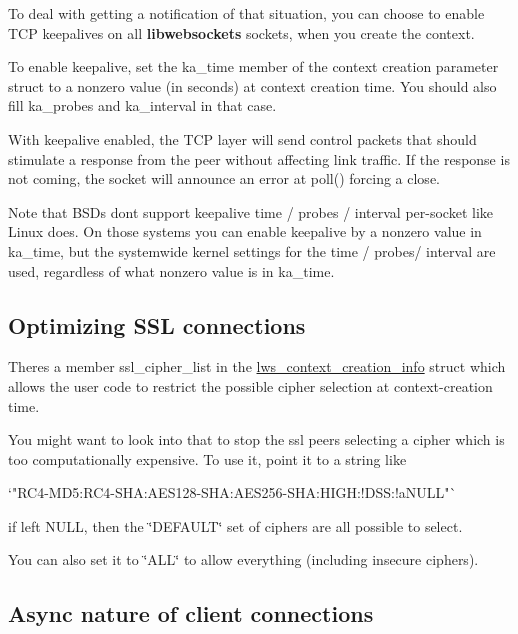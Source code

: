 To deal with getting a notification of that situation, you can choose to enable T\+CP keepalives on all {\bfseries libwebsockets} sockets, when you create the context.

To enable keepalive, set the ka\+\_\+time member of the context creation parameter struct to a nonzero value (in seconds) at context creation time. You should also fill ka\+\_\+probes and ka\+\_\+interval in that case.

With keepalive enabled, the T\+CP layer will send control packets that should stimulate a response from the peer without affecting link traffic. If the response is not coming, the socket will announce an error at {\ttfamily poll()} forcing a close.

Note that B\+S\+Ds don\textquotesingle{}t support keepalive time / probes / interval per-\/socket like Linux does. On those systems you can enable keepalive by a nonzero value in {\ttfamily ka\+\_\+time}, but the systemwide kernel settings for the time / probes/ interval are used, regardless of what nonzero value is in {\ttfamily ka\+\_\+time}.

\subsection*{Optimizing S\+SL connections }

There\textquotesingle{}s a member {\ttfamily ssl\+\_\+cipher\+\_\+list} in the {\ttfamily \hyperlink{structlws__context__creation__info}{lws\+\_\+context\+\_\+creation\+\_\+info}} struct which allows the user code to restrict the possible cipher selection at context-\/creation time.

You might want to look into that to stop the ssl peers selecting a cipher which is too computationally expensive. To use it, point it to a string like \begin{DoxyVerb}    `"RC4-MD5:RC4-SHA:AES128-SHA:AES256-SHA:HIGH:!DSS:!aNULL"`
\end{DoxyVerb}


if left {\ttfamily N\+U\+LL}, then the \char`\"{}\+D\+E\+F\+A\+U\+L\+T\char`\"{} set of ciphers are all possible to select.

You can also set it to {\ttfamily \char`\"{}\+A\+L\+L\char`\"{}} to allow everything (including insecure ciphers).

\subsection*{Async nature of client connections }

